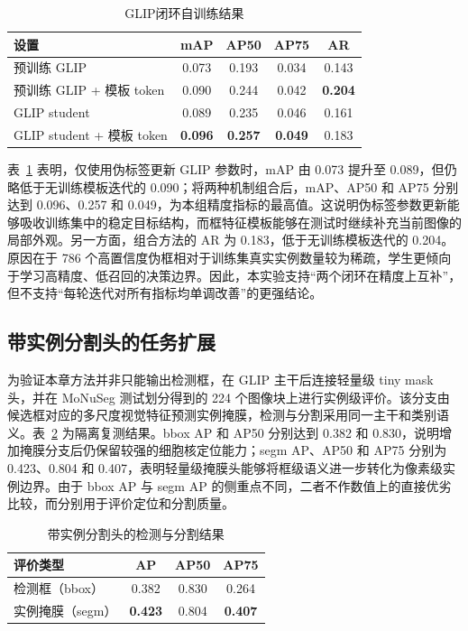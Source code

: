 \begin{table}[htbp]
\centering
\caption{GLIP闭环自训练结果}
\label{tab:attrip_glip_student}
\begin{tabular}{lcccc}
\toprule[1.5pt]
\textbf{设置} & \textbf{mAP} & \textbf{AP50} & \textbf{AP75} & \textbf{AR} \\ \midrule[1.2pt]
预训练 GLIP & 0.073 & 0.193 & 0.034 & 0.143 \\
预训练 GLIP + 模板 token & 0.090 & 0.244 & 0.042 & \textbf{0.204} \\
GLIP student & 0.089 & 0.235 & 0.046 & 0.161 \\
GLIP student + 模板 token & \textbf{0.096} & \textbf{0.257} & \textbf{0.049} & 0.183 \\ \bottomrule[1.5pt]
\end{tabular}
\end{table}

表~\ref{tab:attrip_glip_student} 表明，仅使用伪标签更新 GLIP 参数时，mAP 由 0.073 提升至 0.089，但仍略低于无训练模板迭代的 0.090；将两种机制组合后，mAP、AP50 和 AP75 分别达到 0.096、0.257 和 0.049，为本组精度指标的最高值。这说明伪标签参数更新能够吸收训练集中的稳定目标结构，而框特征模板能够在测试时继续补充当前图像的局部外观。另一方面，组合方法的 AR 为 0.183，低于无训练模板迭代的 0.204。原因在于 786 个高置信度伪框相对于训练集真实实例数量较为稀疏，学生更倾向于学习高精度、低召回的决策边界。因此，本实验支持“两个闭环在精度上互补”，但不支持“每轮迭代对所有指标均单调改善”的更强结论。

\subsection{带实例分割头的任务扩展}

为验证本章方法并非只能输出检测框，在 GLIP 主干后连接轻量级 tiny mask 头，并在 MoNuSeg 测试划分得到的 224 个图像块上进行实例级评价。该分支由候选框对应的多尺度视觉特征预测实例掩膜，检测与分割采用同一主干和类别语义。表~\ref{tab:attrip_mask_head} 为隔离复测结果。bbox AP 和 AP50 分别达到 0.382 和 0.830，说明增加掩膜分支后仍保留较强的细胞核定位能力；segm AP、AP50 和 AP75 分别为 0.423、0.804 和 0.407，表明轻量级掩膜头能够将框级语义进一步转化为像素级实例边界。由于 bbox AP 与 segm AP 的侧重点不同，二者不作数值上的直接优劣比较，而分别用于评价定位和分割质量。

\begin{table}[htbp]
\centering
\caption{带实例分割头的检测与分割结果}
\label{tab:attrip_mask_head}
\begin{tabular}{lccc}
\toprule[1.5pt]
\textbf{评价类型} & \textbf{AP} & \textbf{AP50} & \textbf{AP75} \\ \midrule[1.2pt]
检测框（bbox） & 0.382 & 0.830 & 0.264 \\
实例掩膜（segm） & \textbf{0.423} & 0.804 & \textbf{0.407} \\ \bottomrule[1.5pt]
\end{tabular}
\end{table}


